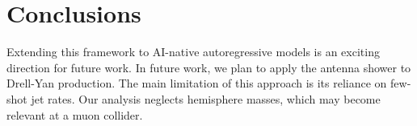 \section{Conclusions}\label{sec:conclusions}

Extending this framework to AI-native autoregressive models is an
exciting direction for future work. In future work, we plan to apply the
antenna shower to Drell-Yan production. The main limitation of this
approach is its reliance on few-shot jet rates. Our analysis neglects
hemisphere masses, which may become relevant at a muon collider.

